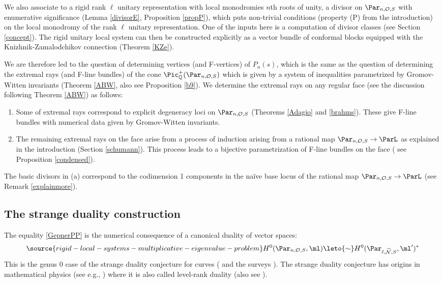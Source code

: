 We also associate to a rigid rank $\ell$ unitary representation with local monodromies $n$th roots of unity, a divisor on $\Par_{n,\mathcal{O},S }$ with enumerative significance (Lemma \ref{divisorE}, Proposition \ref{propP}), which puts non-trivial conditions (property (P) from the introduction) on the local monodromy of the rank $\ell$ unitary representation. One of the inputs here is a computation of divisor classes (see Section \ref{concept}).
The rigid unitary local system can then be constructed explicitly as a vector bundle of conformal blocks  equipped with the  Knizhnik-Zamalodchikov connection (Theorem \ref{KZe}).

We are therefore led to the question of determining vertices (and F-vertices)  of $P_n(s)$, which is the same as the question of determining the  extremal rays (and F-line bundles) of the cone $\Pic^+_{\Bbb{Q}}(\Par_{n,\mathcal{O},S})$ which is given by a system of inequalities parametrized by Gromov-Witten invariants  (Theorem \ref{ABW}, also see Proposition \ref{b9}). We determine the extremal rays on any regular face (see the discussion following Theorem \ref{ABW}) as follows:
\begin{enumerate}
\item[(a)] Some of extremal rays  correspond to explicit degeneracy loci  on $\Par_{n,\mathcal{O},S}$ (Theorems  \ref{Adagio} and \ref{brahms}). These give F-line bundles with numerical data given by Gromov-Witten invariants.
\item[(b)] The remaining extremal rays  on the face arise from a process of induction arising from a rational map
$\Par_{n,\mathcal{O},S}\to \ParL$ as explained in the introduction (Section \ref{schumann}). This process leads to a bijective parametrization of F-line bundles on the face  ( see Proposition \ref{condensed}).
\end{enumerate}
 The basic divisors in (a) correspond to the codimension 1 components in the na\"ive base locus of the rational map $\Par_{n,\mathcal{O},S}\to \ParL$ (see Remark \ref{explainmore}).
  \subsection{The strange duality construction}\label{understanding}
The equality  \eqref{GepnerPP} is the numerical consequence of a canonical  duality of vector spaces:
\begin{equation}\label{canonD}
\source{rigid-local-systems-multiplicative-eigenvalue-problem}
H^0(\Par_{n,\mathcal{O},S},\ml)\leto{\sim} H^0(\Par_{\ell,\widetilde{\mathcal{N}},S},\ml')^*
\end{equation}
 This is the genus $0$ case of the strange duality conjecture for curves (\cite{Betrange,MO,Ou} and the surveys  \cite{paulyB,popa}). The strange duality conjecture has origins in mathematical physics (see e.g., \cite{NT}) where it is also called level-rank duality (also see \cite{BJDG}).

